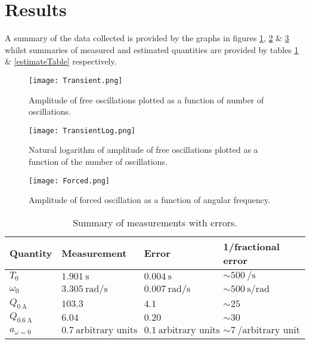 \documentclass[12pt]{article}
\begin{document}
\section{Results}
A summary of the data collected is provided by the graphs in figures \ref{transientGraph}, \ref{transientLogGraph} \& \ref{forcedGraph} whilst summaries of measured and estimated quantities are provided by tables \ref{measurementTable} \& \ref{estimateTable} respectively.
\begin{figure}[H]
    \centering
    \texttt{[image: Transient.png]}
    \caption{Amplitude of free oscillations plotted as a function of number of oscillations.}
    \label{transientGraph}
\end{figure}
\begin{figure}[H]
    \centering
    \texttt{[image: TransientLog.png]}
    \caption{Natural logarithm of amplitude of free oscillations plotted as a function of the number of oscillations.}
    \label{transientLogGraph}
\end{figure}
\begin{figure}[H]
    \centering
    \texttt{[image: Forced.png]}
    \caption{Amplitude of forced oscillation as a function of angular frequency.}
    \label{forcedGraph}
\end{figure}
\begin{table}[H]
    \centering
    \begin{tabular}{| p{2cm} | p{4cm} | p{4cm} | p{4cm} |}
    \hline
    Quantity & Measurement & Error & 1/fractional error \\ \hline
    $T_0$ & $\SI{1.901}{\second}$ & $\SI{0.004}{\second}$ & $\sim\SI{500}{\per\second}$ \\ \hline
    $\omega_0$ & $\SI{3.305}{\radian\per\second}$ & $\SI{0.007}{\radian\per\second}$ & $\sim\SI{500}{\second\per\radian}$ \\ \hline
    $Q_{\SI{0}{\ampere}}$ & $\SI{103.3}{}$ & $\SI{4.1}{}$ & $\sim\SI{25}{}$ \\ \hline
    $Q_{\SI{0.6}{\ampere}}$ & $\SI{6.04}{}$ & $\SI{0.20}{}$ & $\sim\SI{30}{}$ \\ \hline
    $a_{\omega=0}$ & $\SI{0.7}{\text{arbitrary units}}$ & $\SI{0.1}{\text{arbitrary units}}$ & $\sim\SI{7}{\per\text{arbitrary unit}}$ \\ \hline
    \end{tabular}
    \caption{Summary of measurements with errors.}
    \label{measurementTable}
\end{table}
\end{document}
